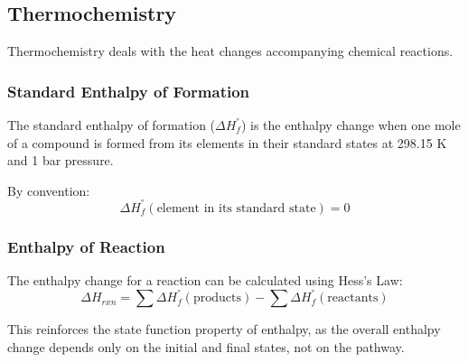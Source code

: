 \documentclass{article}
\theoremstyle{definition}
\begin{document}
\subsection{Thermochemistry}

Thermochemistry deals with the heat changes accompanying chemical reactions.

\subsubsection{Standard Enthalpy of Formation}

The standard enthalpy of formation ($\Delta H_f^°$) is the enthalpy change when one mole of a compound is formed from its elements in their standard states at 298.15 K and 1 bar pressure.

By convention:
\[
\Delta H_f^°(\text{element in its standard state}) = 0
\]

\subsubsection{Enthalpy of Reaction}

The enthalpy change for a reaction can be calculated using Hess's Law:
\[
\Delta H_{rxn} = \sum \Delta H_f^°(\text{products}) - \sum \Delta H_f^°(\text{reactants})
\]

This reinforces the state function property of enthalpy, as the overall enthalpy change depends only on the initial and final states, not on the pathway.
\end{document}
